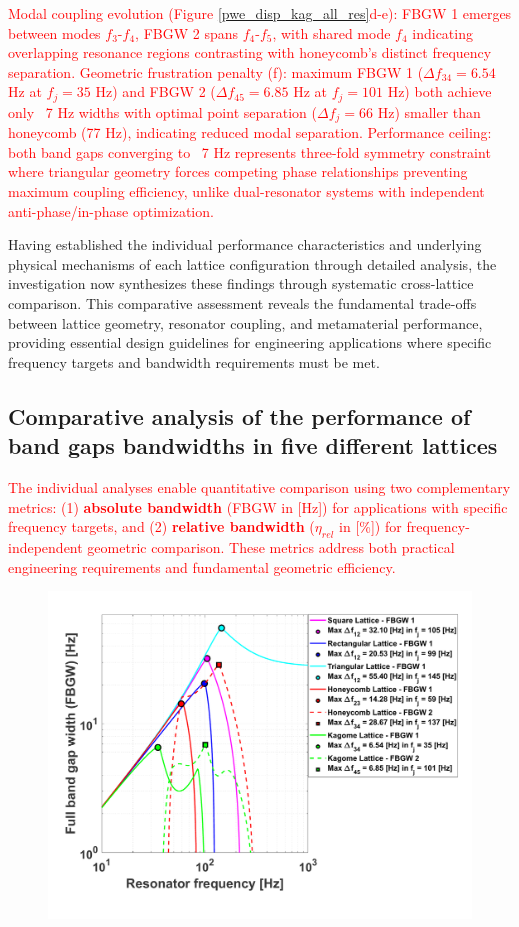 \documentclass[review,numbers,sort&compress]{elsarticle}
\begin{document}
{\textcolor{red}{Modal coupling evolution (Figure \ref{pwe_disp_kag_all_res}d-e): FBGW 1 emerges between modes \( f_3 \)-\( f_4 \), FBGW 2 spans \( f_4 \)-\( f_5 \), with shared mode \( f_4 \) indicating overlapping resonance regions contrasting with honeycomb's distinct frequency separation. Geometric frustration penalty (f): maximum FBGW 1 (\( \Delta f_{34} = 6.54 \) Hz at \( f_j = 35 \) Hz) and FBGW 2 (\( \Delta f_{45} = 6.85 \) Hz at \( f_j = 101 \) Hz) both achieve only ~7 Hz widths with optimal point separation (\( \Delta f_j = 66 \) Hz) smaller than honeycomb (77 Hz), indicating reduced modal separation. Performance ceiling: both band gaps converging to ~7 Hz represents three-fold symmetry constraint where triangular geometry forces competing phase relationships preventing maximum coupling efficiency, unlike dual-resonator systems with independent anti-phase/in-phase optimization.}


Having established the individual performance characteristics and underlying physical mechanisms of each lattice configuration through detailed analysis, the investigation now synthesizes these findings through systematic cross-lattice comparison. This comparative assessment reveals the fundamental trade-offs between lattice geometry, resonator coupling, and metamaterial performance, providing essential design guidelines for engineering applications where specific frequency targets and bandwidth requirements must be met.

\subsection{Comparative analysis of the performance of band gaps bandwidths in five different lattices}
\label{comp_performance_lattices}

\textcolor{red}{The individual analyses enable quantitative comparison using two complementary metrics: (1) \textbf{absolute bandwidth} (FBGW in [Hz]) for applications with specific frequency targets, and (2) \textbf{relative bandwidth} ($\eta_{rel}$ in [\%]) for frequency-independent geometric comparison. These metrics address both practical engineering requirements and fundamental geometric efficiency.}
\newpage
\begin{figure}[t]
\centering
\includegraphics[width=.7\textwidth]{0_disp_comp_lattices.pdf}


\end{figure}}
\end{document}
